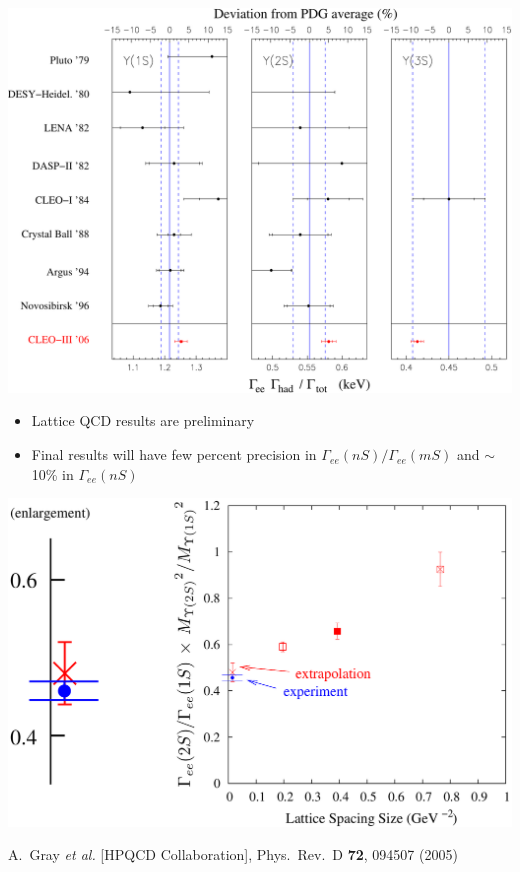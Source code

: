 \documentclass[landscape]{article}
\begin{document}
\begin{slide:conclusions}
\begin{center}
  \includegraphics[width=0.85\linewidth]{plots/historyplot}
\end{center}
\end{slide:conclusions}

\begin{slide:conclusions}
\begin{itemize}

  \item Lattice QCD results are preliminary

  \item Final results will have few percent precision in $\Gamma_{ee}(nS)/\Gamma_{ee}(mS)$ and $\sim$10\% in $\Gamma_{ee}(nS)$

\end{itemize}

\vfill
\begin{center}
  \includegraphics[width=0.8\linewidth]{plots/latticespacingagain}
\end{center}

\vfill
\Large
\hfill A.~Gray {\it et al.} [HPQCD Collaboration], Phys.\ Rev.\ D {\bf 72}, 094507 (2005) \hspace{1.3 cm}

\end{slide:conclusions}
\end{document}
